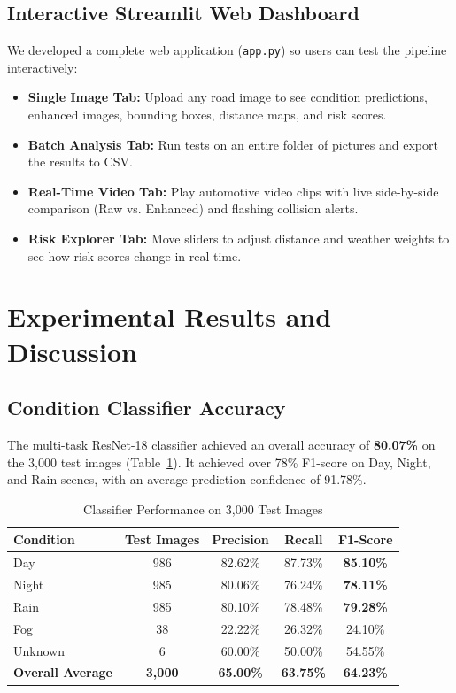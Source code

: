 \documentclass{article}
\begin{document}
\subsection{Interactive Streamlit Web Dashboard}
We developed a complete web application (\texttt{app.py}) so users can test the pipeline interactively:
\begin{itemize}
    \item \textbf{Single Image Tab:} Upload any road image to see condition predictions, enhanced images, bounding boxes, distance maps, and risk scores.
    \item \textbf{Batch Analysis Tab:} Run tests on an entire folder of pictures and export the results to CSV.
    \item \textbf{Real-Time Video Tab:} Play automotive video clips with live side-by-side comparison (Raw vs. Enhanced) and flashing collision alerts.
    \item \textbf{Risk Explorer Tab:} Move sliders to adjust distance and weather weights to see how risk scores change in real time.
\end{itemize}

\newpage
\section{Experimental Results and Discussion}
\label{sec:results}

\subsection{Condition Classifier Accuracy}
The multi-task ResNet-18 classifier achieved an overall accuracy of \textbf{80.07\%} on the 3,000 test images (Table~\ref{tab:classifier_results}). It achieved over 78\% F1-score on Day, Night, and Rain scenes, with an average prediction confidence of 91.78\%.

\begin{table}[!ht]
\centering
\small
\caption{Classifier Performance on 3,000 Test Images}
\label{tab:classifier_results}
\begin{tabular}{lcccc}
\toprule
\textbf{Condition} & \textbf{Test Images} & \textbf{Precision} & \textbf{Recall} & \textbf{F1-Score} \\
\midrule
Day & 986 & 82.62\% & 87.73\% & \textbf{85.10\%} \\
Night & 985 & 80.06\% & 76.24\% & \textbf{78.11\%} \\
Rain & 985 & 80.10\% & 78.48\% & \textbf{79.28\%} \\
Fog & 38 & 22.22\% & 26.32\% & 24.10\% \\
Unknown & 6 & 60.00\% & 50.00\% & 54.55\% \\
\midrule
\textbf{Overall Average} & \textbf{3,000} & \textbf{65.00\%} & \textbf{63.75\%} & \textbf{64.23\%} \\
\bottomrule
\end{tabular}
\end{table}
\end{document}
